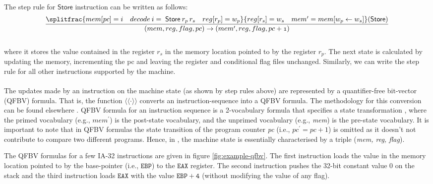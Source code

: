 The step rule for $\mathsf{Store}$ instruction can be written as follows: 
\\
\begin{equation*}
\begin{aligned}
\mathnormal{\frac{ \splitfrac{mem[pc]=i \quad decode \: i = \; \mathsf{Store} \: r_p\, r_s \quad reg[r_p]=w_p}{reg[r_s]=w_s \quad mem^\prime = mem[w_p \leftarrow w_s] \hfill}\mathsf{(Store)}}{(mem, reg, flag, pc) \rightarrow (mem^\prime, reg, flag, pc+1)}}
\end{aligned}
\end{equation*}
\\
where it stores the value contained in the register $r_s$ in the memory location pointed to by the register $r_p$. The next state is calculated by updating the memory, incrementing the pc and leaving the register and conditional flag files unchanged. Similarly, we can write the step rule for all other instructions supported by the machine. 
~\\
\\
The updates made by an instruction on the machine state (as shown by step rules above) are represented by a quantifier-free bit-vector (QFBV) formula.  That is, the function $\langle\!\langle \cdot \rangle\!\rangle$ converts an instruction-sequence into a QFBV formula. The methodology for this conversion can be found elsewhere \cite{lim2011symbolic}. QFBV formula for an instruction sequence is a  2-vocabulary formula that specifies a state transformation 
, where the primed vocabulary (e.g., $\textit{mem}^\prime$) is the post-state vocabulary, and the unprimed vocabulary (e.g., \textit{mem}) is the pre-state vocabulary. It is important to note that in QFBV formulas the state transition of the program counter \textit{pc} (i.e., $pc^\prime = pc+1$) is omitted as it doesn't not contribute to compare two different programs. Hence, in \tool, the machine state is essentially characterised by a triple (\textit{mem, reg, flag}).

The QFBV formulas for a few IA-32 instructions are given in figure \ref{fig:example-qfbv}. The first instruction loads the value in the memory location pointed to by the base-pointer (i.e.,  $\mathtt{EBP}$) to the  $\mathtt{EAX}$ register. The second instruction pushes the 32-bit constant value 0 on the stack and the third instruction loads  $\mathtt{EAX}$ with the value  $\mathtt{EBP+4}$ (without modifying the value of any flag).


